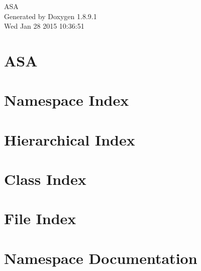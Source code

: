 \documentclass[twoside]{book}
\newcommand{\+}{\discretionary{\mbox{\scriptsize$\hookleftarrow$}}{}{}}
\newcommand{\clearemptydoublepage}{%
  \newpage{\pagestyle{empty}\cleardoublepage}%
}
\begin{document}
\hypersetup{pageanchor=false,
             bookmarks=true,
             bookmarksnumbered=true,
             pdfencoding=unicode
            }
\begin{titlepage}
\vspace*{7cm}
\begin{center}%
{\Large A\+S\+A }\\
\vspace*{1cm}
{\large Generated by Doxygen 1.8.9.1}\\
\vspace*{0.5cm}
{\small Wed Jan 28 2015 10:36:51}\\
\end{center}
\end{titlepage}
\clearemptydoublepage
\tableofcontents
\clearemptydoublepage
{}
\hypersetup{pageanchor=true}

\chapter{A\+S\+A}
\label{md_README}
\hypertarget{md_README}{}

\chapter{Namespace Index}

\chapter{Hierarchical Index}

\chapter{Class Index}

\chapter{File Index}

\chapter{Namespace Documentation}


















\end{document}
